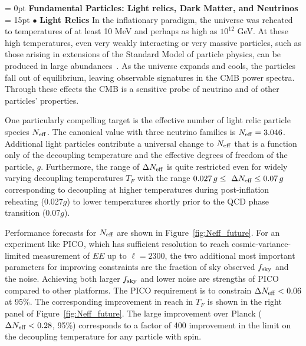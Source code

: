 \documentclass[PICOReport.tex]{subfiles}
\begin{document}
\vspace{0.1in}
\parindent = 0pt
{\bf Fundamental Particles: Light relics, Dark Matter, and Neutrinos} \\ %
\parindent = 15pt
$\bullet$ {\bf Light Relics} \hspace{0.1in} In the inflationary paradigm, the universe was reheated to temperatures of 
at least 10 MeV and perhaps as 
high as $10^{12}$ GeV.  At these high temperatures, even very weakly interacting or very massive particles, 
such as those arising in extensions of the Standard Model of particle physics, can be produced in large 
abundances~\cite{1979ARNPS..29..313S,Bolz:2000fu}.  As the universe expands and cools, 
the particles fall out of equilibrium, leaving observable signatures in the CMB power spectra. 
Through these effects the CMB is a sensitive probe of neutrino and of other particles' properties.  


One particularly compelling target is the effective number of light relic particle species ${N_{\rm eff}}$. The canonical value with three neutrino families is ${N_{\rm eff}} = 3.046$. Additional light particles contribute a universal change to ${N_{\rm eff}}$ that is a function only of the decoupling temperature and the effective degrees of freedom of the particle, $g$. Furthermore, the range of $\Delta{N_{\rm eff}}$ is quite restricted even for widely varying decoupling temperatures $T_{F}$ with the range $ 0.027\,g \leq \ \Delta {N_{\rm eff}} \leq 0.07\,g$ corresponding to decoupling at higher temperatures during post-inflation reheating (0.027$g$) to lower temperatures shortly prior to the QCD phase transition ($0.07g$).

Performance forecasts for ${N_{\rm eff}}$ are shown in Figure~\ref{fig:Neff_future}.  For an experiment like PICO, which has sufficient resolution to reach cosmic-variance-limited measurement of $EE$ up to $\ell =2300$, the two additional most important parameters for improving constraints are the fraction of sky observed $f_{\rm sky}$ and the noise. Achieving both larger $f_{\rm sky}$ and lower noise are strengths of PICO compared to other platforms. The PICO requirement is to constrain $\Delta {N_{\rm eff}} < 0.06$ at 95\%.  The corresponding improvement in reach in $T_{F}$ is shown in the right panel of  Figure~\ref{fig:Neff_future}.  The large improvement over Planck ($\Delta {N_{\rm eff}} < 0.28$, 95\%) corresponds to a factor of 400 improvement in the limit on the decoupling temperature for any particle with spin. 
\end{document}
